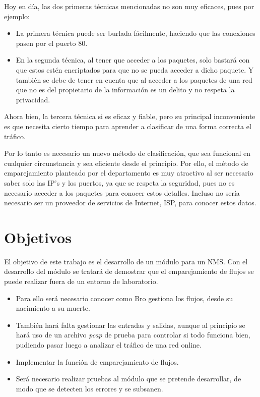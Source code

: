 Hoy en día, las dos primeras técnicas mencionadas no son muy eficaces, pues por ejemplo:
\begin{itemize}
\item La primera técnica puede ser burlada fácilmente, haciendo que las conexiones pasen por el puerto 80.
\item En la segunda técnica, al tener que acceder a los paquetes, solo bastará con que estos estén 
encriptados para que no se pueda acceder a dicho paquete. Y también se debe de tener en cuenta que 
al acceder a los paquetes de una red que no es del propietario de la información es un delito y no respeta 
la privacidad.
\end{itemize}
\intro Ahora bien, la tercera técnica si es eficaz y fiable, pero su principal inconveniente es que 
necesita cierto tiempo para aprender a clasificar de una forma correcta el tráfico.

\intro Por lo tanto es necesario un nuevo método de clasificación, que sea funcional en cualquier circunstancia 
y sea eficiente desde el principio. Por ello, el método de emparejamiento planteado por el 
departamento \cite{comparacion} es muy atractivo al ser necesario saber solo las IP's y los puertos, 
ya que se respeta la seguridad, pues no es necesario acceder a los paquetes para conocer estos detalles. Incluso 
no sería necesario ser un proveedor de servicios de Internet, ISP, para conocer estos datos.


\section{Objetivos}

El objetivo de este trabajo es el desarrollo de un módulo para un NMS. Con el desarrollo del módulo se tratará 
de demostrar que el emparejamiento de flujos se puede realizar fuera de un entorno de laboratorio.

\begin{itemize}
\item Para ello será necesario conocer como Bro gestiona los flujos, desde su nacimiento a su muerte. 
\item También hará falta gestionar las entradas y salidas, aunque al principio se hará uso de un 
archivo \textit{pcap} de prueba para controlar si todo funciona bien, pudiendo pasar luego a analizar 
el tráfico de una red online.
\item Implementar la función de emparejamiento de flujos.
\item Será necesario realizar pruebas al módulo que se pretende desarrollar, de modo que se detecten los 
errores y se subsanen.
\end{itemize}

